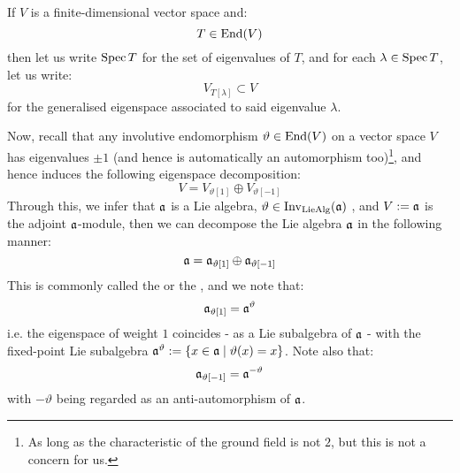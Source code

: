         \begin{convention}
            If $V$ is a finite-dimensional vector space and:
                $$T \in \operatorname{End}(V)$$
            then let us write $\operatorname{Spec} T$ for the set of eigenvalues of $T$, and for each $\lambda \in \operatorname{Spec} T$, let us write:
                $$V_{T[\lambda]} \subset V$$
            for the generalised eigenspace associated to said eigenvalue $\lambda$.
        \end{convention}
        Now, recall that any involutive endomorphism $\vartheta \in \operatorname{End}(V)$ on a vector space $V$ has eigenvalues $\pm 1$ (and hence is automatically an automorphism too)\footnote{As long as the characteristic of the ground field is not $2$, but this is not a concern for us.}, and hence induces the following eigenspace decomposition:
            $$V = V_{\vartheta[1]} \oplus V_{\vartheta[-1]}$$
        Through this, we infer that $\mathfrak{a}$ is a Lie algebra, $\vartheta \in \operatorname{Inv}_{\mathrm{Lie}\mathrm{Alg}}(\mathfrak{a})$ , and $V := \mathfrak{a}$ is the adjoint $\mathfrak{a}$-module, then we can decompose the Lie algebra $\mathfrak{a}$ in the following manner:
            \begin{equation} \label{equation: symmetric_space_decomposition}
                \mathfrak{a} = \mathfrak{a}_{\vartheta[1]} \oplus \mathfrak{a}_{\vartheta[-1]}
            \end{equation}
        This is commonly called the  or the , and we note that:
            $$\mathfrak{a}_{\vartheta[1]} = \mathfrak{a}^{\vartheta}$$
        i.e. the eigenspace of weight $1$ coincides - as a Lie subalgebra of $\mathfrak{a}$ - with the fixed-point Lie subalgebra $\mathfrak{a}^{\vartheta} := \{x \in \mathfrak{a} \mid \vartheta(x) = x\}$. Note also that:
            $$\mathfrak{a}_{\vartheta[-1]} = \mathfrak{a}^{-\vartheta}$$
        with $-\vartheta$ being regarded as an anti-automorphism of $\mathfrak{a}$.


